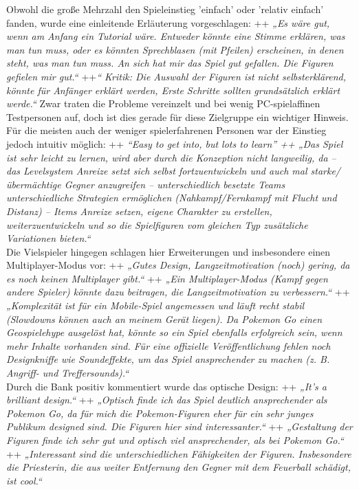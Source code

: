 \documentclass[extern,palatino]{cgBA}
\begin{document}
Obwohl die große Mehrzahl den Spieleinstieg 'einfach' oder 'relativ einfach' fanden, wurde eine einleitende Erläuterung vorgeschlagen: ++ \textit{„Es wäre gut, wenn am Anfang ein Tutorial wäre. Entweder könnte eine Stimme erklären, was man tun muss, oder es könnten Sprechblasen (mit Pfeilen) erscheinen, in denen steht, was man tun muss. An sich hat mir das Spiel gut gefallen. Die Figuren gefielen mir gut.“} ++\textit{“ Kritik: Die Auswahl der Figuren ist nicht selbsterklärend, könnte für Anfänger erklärt werden, Erste Schritte sollten grundsätzlich erklärt werde.“} Zwar traten die Probleme vereinzelt und bei  wenig PC-spielaffinen Testpersonen auf, doch ist dies gerade für diese Zielgruppe ein wichtiger Hinweis. Für die meisten auch der weniger spielerfahrenen Personen war der Einstieg jedoch intuitiv möglich: ++ \textit{“Easy to get into, but lots to learn” ++ „Das Spiel ist sehr leicht zu lernen, wird aber durch die Konzeption nicht langweilig, da – das Levelsystem Anreize setzt sich selbst fortzuentwickeln und auch mal starke/übermächtige Gegner anzugreifen – unterschiedlich besetzte Teams unterschiedliche Strategien ermöglichen (Nahkampf/Fernkampf  mit Flucht und Distanz) – Items Anreize setzen, eigene Charakter zu erstellen, weiterzuentwickeln und so die Spielfiguren vom gleichen Typ zusätzliche Variationen bieten.“}\\
Die Vielspieler hingegen schlagen hier Erweiterungen und insbesondere einen Multiplayer-Modus vor: ++ \textit{„Gutes Design, Langzeitmotivation (noch) gering, da es noch keinen Multiplayer gibt.“} ++ \textit{„Ein Multiplayer-Modus (Kampf gegen andere Spieler) könnte dazu beitragen, die Langzeitmotivation zu verbessern.“} ++ \textit{„Komplexität ist für ein Mobile-Spiel angemessen und läuft recht stabil (Slowdowns können auch an meinem Gerät liegen). Da Pokemon Go einen Geospielehype ausgelöst hat, könnte so ein Spiel ebenfalls erfolgreich sein, wenn mehr Inhalte vorhanden sind. Für eine offizielle Veröffentlichung fehlen noch Designkniffe wie Soundeffekte, um das Spiel ansprechender zu machen (z. B. Angriff- und Treffersounds).“}
\\Durch die Bank positiv kommentiert wurde das optische Design: ++ \textit{„It's a brilliant design.“} ++ \textit{„Optisch finde ich das Spiel deutlich ansprechender als Pokemon Go, da für mich die Pokemon-Figuren eher für ein sehr junges Publikum designed sind. Die Figuren hier sind interessanter.“} ++ \textit{„Gestaltung der Figuren finde ich sehr gut und optisch viel ansprechender, als bei Pokemon Go.“} ++ \textit{„Interessant sind die unterschiedlichen Fähigkeiten der Figuren. Insbesondere die Priesterin, die aus weiter Entfernung den Gegner mit dem Feuerball schädigt, ist cool.“} 
\end{document}
